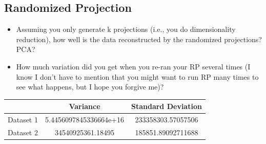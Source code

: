 \subsection{Randomized Projection}\label{subsec:randomized-projection}
\begin{itemize}

    \item Assuming you only generate k projections (i.e., you do dimensionality reduction), how well is the data reconstructed by the randomized projections? PCA?
    \item How much variation did you get when you re-ran your RP several times (I know I don't have to mention that you might want to run RP many times to see what happens, but I hope you forgive me)?
\end{itemize}
\begin{center}
    \begin{tabular}{|c| c |c|}
        \hline
        & Variance               & Standard Deviation \\
        \hline
        \hline
        Dataset 1 & 5.4456097845336664e+16 & 233358303.57057506 \\
        \hline
        Dataset 2 & 34540925361.18495      & 185851.89092711688 \\
        \hline
    \end{tabular}
\end{center}
